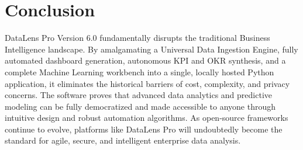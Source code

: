 \documentclass[12pt, a4paper]{article}
\begin{document}
\section{Conclusion}
DataLens Pro Version 6.0 fundamentally disrupts the traditional Business Intelligence landscape. By amalgamating a Universal Data Ingestion Engine, fully automated dashboard generation, autonomous KPI and OKR synthesis, and a complete Machine Learning workbench into a single, locally hosted Python application, it eliminates the historical barriers of cost, complexity, and privacy concerns. The software proves that advanced data analytics and predictive modeling can be fully democratized and made accessible to anyone through intuitive design and robust automation algorithms. As open-source frameworks continue to evolve, platforms like DataLens Pro will undoubtedly become the standard for agile, secure, and intelligent enterprise data analysis.
\end{document}

